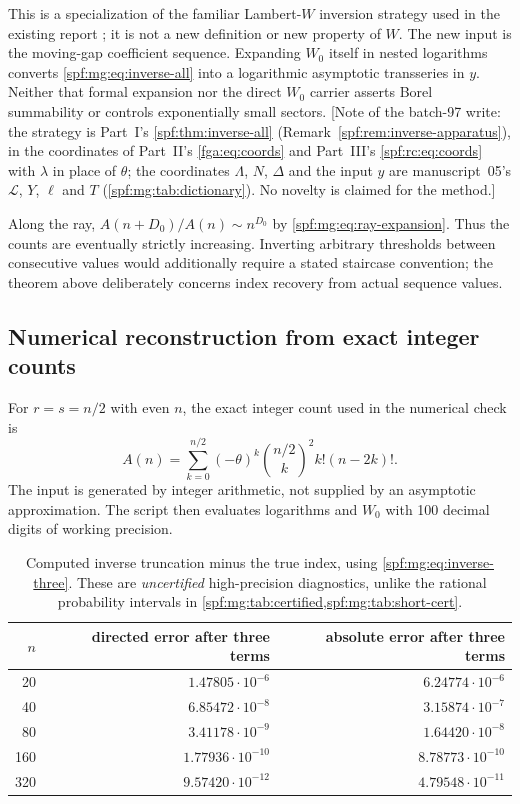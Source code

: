 \documentclass[11pt]{article}
\numberwithin{equation}{section}
\theoremstyle{definition}
\theoremstyle{remark}
\theoremstyle{definition}
\begin{document}
This is a specialization of the familiar Lambert-$W$ inversion strategy
used in the existing report \cite{mgProveIt}; it is not a new definition or
new property of $W$. The new input is the moving-gap coefficient sequence.
Expanding $W_0$ itself in nested logarithms converts
\eqref{spf:mg:eq:inverse-all} into a logarithmic asymptotic transseries in $y$.
Neither that formal expansion nor the direct $W_0$ carrier asserts Borel
summability or controls exponentially small sectors.
[Note of the batch-97 write: the strategy is Part~I's
\cref{spf:thm:inverse-all} (Remark~\ref{spf:rem:inverse-apparatus}), in the
coordinates of Part~II's \eqref{fga:eq:coords} and Part~III's
\eqref{spf:rc:eq:coords} with $\lambda$ in place of $\theta$; the coordinates
$\Lambda$, $N$, $\Delta$ and the input $y$ are manuscript~05's $\mathcal L$,
$Y$, $\ell$ and $T$ (\cref{spf:mg:tab:dictionary}). No novelty is claimed
for the method.]

Along the ray, $A(n+D_0)/A(n)\sim n^{D_0}$ by
\eqref{spf:mg:eq:ray-expansion}. Thus the counts are eventually strictly
increasing. Inverting arbitrary thresholds between consecutive values
would additionally require a stated staircase convention; the theorem
above deliberately concerns index recovery from actual sequence values.

\subsection{Numerical reconstruction from exact integer counts}

For $r=s=n/2$ with even $n$, the exact integer count used in the numerical
check is
\begin{equation}
 A(n)=\sum_{k=0}^{n/2}(-\theta)^k
       \binom{n/2}{k}^{\!2}k!(n-2k)!.
 \label{spf:mg:eq:integer-matching}
\end{equation}
The input is generated by integer arithmetic, not supplied by an
asymptotic approximation. The script then evaluates logarithms and
$W_0$ with 100 decimal digits of working precision.

\begin{table}[htbp]
\centering\small
\renewcommand{\arraystretch}{1.12}
\begin{tabular}{@{}rrr@{}}
\toprule
$n$ & directed error after three terms & absolute error after three terms\\
\midrule
20  & $1.47805\cdot10^{-6}$ & $6.24774\cdot10^{-6}$\\
40  & $6.85472\cdot10^{-8}$ & $3.15874\cdot10^{-7}$\\
80  & $3.41178\cdot10^{-9}$ & $1.64420\cdot10^{-8}$\\
160 & $1.77936\cdot10^{-10}$ & $8.78773\cdot10^{-10}$\\
320 & $9.57420\cdot10^{-12}$ & $4.79548\cdot10^{-11}$\\
\bottomrule
\end{tabular}
\caption{Computed inverse truncation minus the true index, using
\eqref{spf:mg:eq:inverse-three}. These are \emph{uncertified} high-precision
diagnostics, unlike the rational probability intervals in
\cref{spf:mg:tab:certified,spf:mg:tab:short-cert}.}
\label{spf:mg:tab:inverse}
\end{table}
\end{document}
